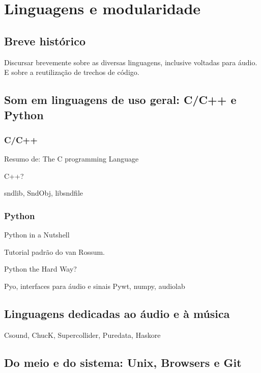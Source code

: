 \section{Linguagens e modularidade}

  \subsection{Breve histórico}

  Discursar brevemente sobre as diversas linguagens,
  inclusive voltadas para áudio. E sobre a reutilização
  de trechos de código.

  \subsection{Som em linguagens de uso geral: C/C++ e Python}

      \subsubsection{C/C++}

      Resumo de:
      The C programming Language

      C++?

      sndlib, SndObj, libsndfile

      \subsubsection{Python}

      Python in a Nutshell

      Tutorial padrão do van Rossum.

      Python the Hard Way?

      Pyo, interfaces para áudio e sinais Pywt, numpy, audiolab

  \subsection{Linguagens dedicadas ao áudio e à música}
Csound, ChucK, Supercollider, Puredata, Haskore
  

  \subsection{Do meio e do sistema: Unix, Browsers e Git}

